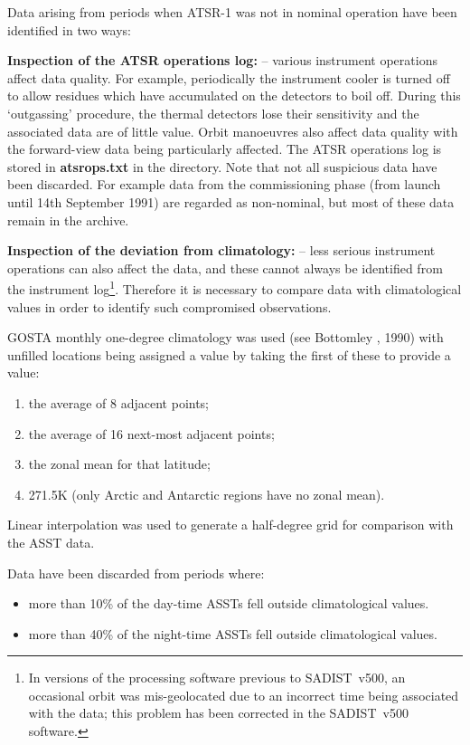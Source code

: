Data arising from periods when ATSR-1 was not in nominal operation have been 
identified in two ways:

{\bf Inspection of the ATSR operations log:} -- 
various instrument operations affect data quality.
For example, periodically the instrument cooler is turned off to allow
residues which have accumulated on the detectors to boil off.
During this `outgassing' procedure, the thermal detectors lose their
sensitivity and the associated data are of little value.
Orbit manoeuvres also affect data quality with the forward-view data
being particularly affected.
The ATSR operations log is 
stored in {\bf atsrops.txt} in the  directory.
Note that not all suspicious data have been discarded. For example
data from the commissioning phase (from launch until 14th September 1991) 
are regarded as non-nominal, but most of these data remain in the archive.


{\bf Inspection of the deviation from climatology:} --
less serious instrument operations can also affect the data, and these 
cannot always be identified from the instrument 
log\footnote{In versions of the processing software previous to SADIST~v500, 
an occasional orbit was mis-geolocated due to an incorrect time being 
associated with the data; this problem has been corrected in the 
SADIST~v500 software.}.
Therefore it is necessary to compare data with climatological values
in order to identify such compromised observations.

GOSTA monthly one-degree climatology was used (see Bottomley \etal, 1990) with 
unfilled locations being assigned a value by taking the first of these to
provide a value:
\begin{enumerate}
\item the average of 8 adjacent points;
\item the average of 16 next-most adjacent points;
\item the zonal mean for that latitude;
\item 271.5K (only Arctic and  Antarctic regions have no zonal mean).
\end{enumerate}
Linear interpolation was used to generate a half-degree grid for 
comparison with the ASST data.
                    
Data have been discarded from periods  where:
\begin{itemize}
\item more than 10\% of the day-time ASSTs fell outside climatological 
values.
\item more than 40\% of the night-time ASSTs fell outside climatological 
values.
\end{itemize}

